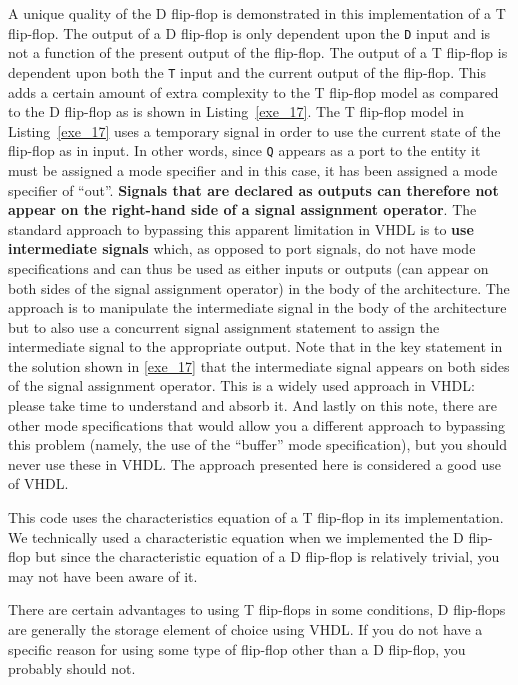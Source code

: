 \begin{my_list}
\item A unique quality of the D flip-flop is demonstrated in this implementation of a T flip-flop. The output of a D flip-flop is only dependent upon the \texttt{D} input and is not a function of the present output of the flip-flop. The output of a T flip-flop is dependent upon both the \texttt{T} input and the current output of the flip-flop. This adds a certain amount of extra complexity to the T flip-flop model as compared to the D flip-flop as is shown in Listing~\ref{exe_17}. The T flip-flop model in Listing~\ref{exe_17} uses a temporary signal in order to use the current state of the flip-flop as in input. In other words, since \texttt{Q} appears as a port to the entity it must be assigned a mode specifier and in this case, it has been assigned a mode specifier of ``out''. \textbf{Signals that are declared as outputs can therefore not appear on the right-hand side of a signal assignment operator}. The standard approach to bypassing this apparent limitation in VHDL is to \textbf{use intermediate signals} which, as opposed to port signals, do not have mode specifications and can thus be used as either inputs or outputs (can appear on both sides of the signal assignment operator) in the body of the architecture. The approach is to manipulate the intermediate signal in the body of the architecture but to also use a concurrent signal assignment statement to assign the intermediate signal to the appropriate output. Note that in the key statement in the solution shown in \ref{exe_17} that the intermediate signal appears on both sides of the signal assignment operator. This is a widely used approach in VHDL: please take time to understand and absorb it. And lastly on this note, there are other mode specifications that would allow you a different approach to bypassing this problem (namely, the use of the ``buffer'' mode specification), but you should never use these in VHDL. The approach presented here is considered a good use of VHDL. 

\item This code uses the characteristics equation of a T flip-flop in its implementation. We technically used a characteristic equation when we implemented the D flip-flop but since the characteristic equation of a D flip-flop is relatively trivial, you may not have been aware of it.
\item There are certain advantages to using T flip-flops in some conditions, D flip-flops are generally the storage element of choice using VHDL. If you do not have a specific reason for using some type of flip-flop other than a D flip-flop, you probably should not. 
\end{my_list}


